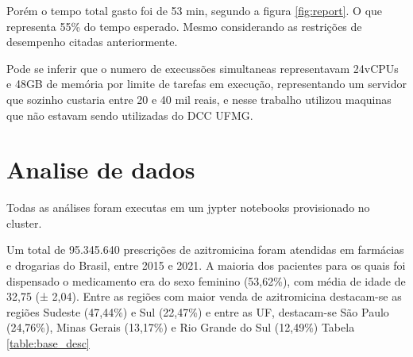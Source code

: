 Porém o tempo total gasto foi de 53 min, segundo a figura \ref{fig:report}. O que representa 55\% do tempo esperado. Mesmo considerando as restrições de desempenho citadas anteriormente.

Pode se inferir que o numero de execussões simultaneas representavam 24vCPUs e 48GB de memória por limite de tarefas em execução, representando um servidor que sozinho custaria entre 20 e 40 mil reais, e nesse trabalho utilizou maquinas que não estavam sendo utilizadas do DCC UFMG.



\section{Analise de dados}
Todas as análises foram executas em um jypter notebooks provisionado no cluster.

Um total de 95.345.640 prescrições de azitromicina foram atendidas em farmácias e drogarias do Brasil, entre 2015 e 2021. A maioria dos pacientes para os quais foi dispensado o medicamento era do sexo feminino (53,62\%), com média de idade de 32,75 (± 2,04). Entre as regiões com maior venda de azitromicina destacam-se as regiões Sudeste (47,44\%) e Sul (22,47\%) e entre as UF, destacam-se São Paulo (24,76\%), Minas Gerais (13,17\%) e Rio Grande do Sul (12,49\%) Tabela \ref{table:base_desc}

